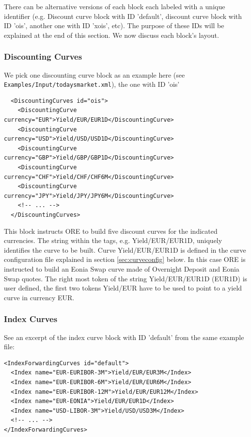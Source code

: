There can be alternative versions of each block each labeled with a unique identifier (e.g. Discount curve block with ID
'default', discount curve block with ID 'ois', another one with ID 'xois', etc). The purpose of these IDs will be
explained at the end of this section. We now discuss each block's layout.

\subsubsection{Discounting Curves} 

We pick one discounting curve block as an example here (see {\tt Examples/Input/todaysmarket.xml}), the one with ID 'ois' 

\begin{listing}[H]
\begin{verbatim}
  <DiscountingCurves id="ois">
    <DiscountingCurve currency="EUR">Yield/EUR/EUR1D</DiscountingCurve>
    <DiscountingCurve currency="USD">Yield/USD/USD1D</DiscountingCurve>
    <DiscountingCurve currency="GBP">Yield/GBP/GBP1D</DiscountingCurve>
    <DiscountingCurve currency="CHF">Yield/CHF/CHF6M</DiscountingCurve>
    <DiscountingCurve currency="JPY">Yield/JPY/JPY6M</DiscountingCurve>
    <!-- ... -->
  </DiscountingCurves>
\end{verbatim}
\caption{Discount curve block with ID 'ois'}
\label{lst:discountcurve_spec}
\end{listing}

This block instructs ORE to build five discount curves for the indicated currencies. The string within the tags,
e.g. Yield/EUR/EUR1D, uniquely identifies the curve to be built.  Curve Yield/EUR/EUR1D is defined in the curve
configuration file explained in section \ref{sec:curveconfig} below. In this case ORE is instructed to build an Eonia
Swap curve made of Overnight Deposit and Eonia Swap quotes. The right most token of the string Yield/EUR/EUR1D (EUR1D)
is user defined, the first two tokens Yield/EUR have to be used to point to a yield curve in currency EUR.
 
\subsubsection{Index Curves} 

See an excerpt of the index curve block with ID 'default' from the same example file:

\begin{listing}[H]
\begin{verbatim}
<IndexForwardingCurves id="default">
  <Index name="EUR-EURIBOR-3M">Yield/EUR/EUR3M</Index>
  <Index name="EUR-EURIBOR-6M">Yield/EUR/EUR6M</Index>
  <Index name="EUR-EURIBOR-12M">Yield/EUR/EUR12M</Index>
  <Index name="EUR-EONIA">Yield/EUR/EUR1D</Index>
  <Index name="USD-LIBOR-3M">Yield/USD/USD3M</Index>
  <!-- ... -->
</IndexForwardingCurves>
\end{verbatim}
\caption{Index curve block with ID 'default'}
\label{lst:indexcurve_spec}
\end{listing}


